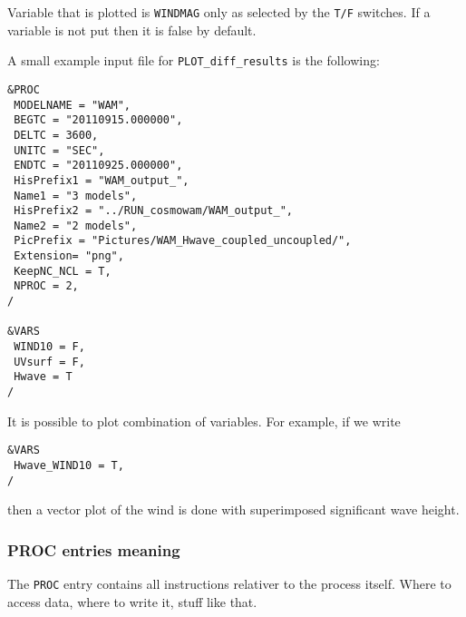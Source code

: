 \documentclass[12pt]{amsart}
\begin{document}
Variable that is plotted is {\tt WINDMAG} only as selected by the {\tt T/F} switches. If a variable is not put then it is false by default.

A small example input file for {\tt PLOT\_diff\_results} is the following:
\begin{verbatim}
&PROC
 MODELNAME = "WAM", 
 BEGTC = "20110915.000000", 
 DELTC = 3600, 
 UNITC = "SEC", 
 ENDTC = "20110925.000000", 
 HisPrefix1 = "WAM_output_", 
 Name1 = "3 models",
 HisPrefix2 = "../RUN_cosmowam/WAM_output_", 
 Name2 = "2 models",
 PicPrefix = "Pictures/WAM_Hwave_coupled_uncoupled/",
 Extension= "png",
 KeepNC_NCL = T,
 NPROC = 2,
/

&VARS
 WIND10 = F, 
 UVsurf = F, 
 Hwave = T
/
\end{verbatim}

It is possible to plot combination of variables. For example, if we write
\begin{verbatim}
&VARS
 Hwave_WIND10 = T, 
/
\end{verbatim}
then a vector plot of the wind is done with superimposed significant wave height.


\subsubsection{PROC entries meaning}
The {\tt PROC} entry contains all instructions relativer to the process itself.
Where to access data, where to write it, stuff like that.
\end{document}
